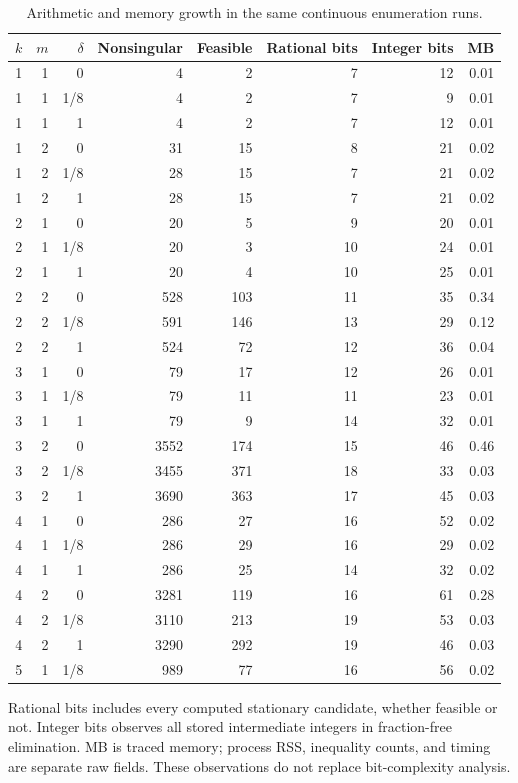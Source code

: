 \begin{table}[p]\centering\small
\caption{Arithmetic and memory growth in the same continuous enumeration runs.}\label{tab:r43-bits}
\begin{tabular}{rrrrrrrr}\toprule
$k$ & $m$ & $\delta$ & Nonsingular & Feasible & Rational bits & Integer bits & MB\\\midrule
1 & 1 & 0 & 4 & 2 & 7 & 12 & 0.01 \\
1 & 1 & 1/8 & 4 & 2 & 7 & 9 & 0.01 \\
1 & 1 & 1 & 4 & 2 & 7 & 12 & 0.01 \\
1 & 2 & 0 & 31 & 15 & 8 & 21 & 0.02 \\
1 & 2 & 1/8 & 28 & 15 & 7 & 21 & 0.02 \\
1 & 2 & 1 & 28 & 15 & 7 & 21 & 0.02 \\
2 & 1 & 0 & 20 & 5 & 9 & 20 & 0.01 \\
2 & 1 & 1/8 & 20 & 3 & 10 & 24 & 0.01 \\
2 & 1 & 1 & 20 & 4 & 10 & 25 & 0.01 \\
2 & 2 & 0 & 528 & 103 & 11 & 35 & 0.34 \\
2 & 2 & 1/8 & 591 & 146 & 13 & 29 & 0.12 \\
2 & 2 & 1 & 524 & 72 & 12 & 36 & 0.04 \\
3 & 1 & 0 & 79 & 17 & 12 & 26 & 0.01 \\
3 & 1 & 1/8 & 79 & 11 & 11 & 23 & 0.01 \\
3 & 1 & 1 & 79 & 9 & 14 & 32 & 0.01 \\
3 & 2 & 0 & 3552 & 174 & 15 & 46 & 0.46 \\
3 & 2 & 1/8 & 3455 & 371 & 18 & 33 & 0.03 \\
3 & 2 & 1 & 3690 & 363 & 17 & 45 & 0.03 \\
4 & 1 & 0 & 286 & 27 & 16 & 52 & 0.02 \\
4 & 1 & 1/8 & 286 & 29 & 16 & 29 & 0.02 \\
4 & 1 & 1 & 286 & 25 & 14 & 32 & 0.02 \\
4 & 2 & 0 & 3281 & 119 & 16 & 61 & 0.28 \\
4 & 2 & 1/8 & 3110 & 213 & 19 & 53 & 0.03 \\
4 & 2 & 1 & 3290 & 292 & 19 & 46 & 0.03 \\
5 & 1 & 1/8 & 989 & 77 & 16 & 56 & 0.02 \\
\bottomrule\end{tabular}
\par\smallskip\begin{minipage}{\textwidth}\small
Rational bits includes every computed stationary candidate, whether feasible or not. Integer bits observes all stored intermediate integers in fraction-free elimination. MB is traced memory; process RSS, inequality counts, and timing are separate raw fields. These observations do not replace bit-complexity analysis.
\end{minipage}\end{table}
